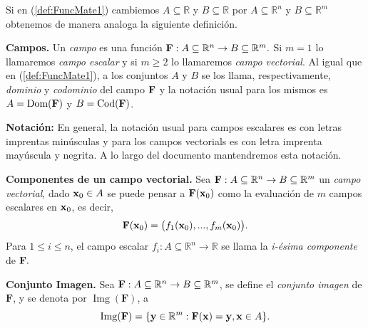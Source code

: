 
\begin{obs}
Si en  (\ref{def:FuncMate1})  cambiemos  $A \subseteq \mathbb{R}$ y $B\subseteq \mathbb{R}$ por $A \subseteq \mathbb{R}^{n}$ y $B \subseteq \mathbb{R}^{m}$  obtenemos de manera analoga la siguiente definici\'on.    
\end{obs}





\begin{definition} \textbf{Campos.}
  Un \textit{campo} es una funci\'on   $\campoVec{F}:A\subseteq \mathbb{R}^n \rightarrow B \subseteq \mathbb{R}^m.$    Si $m=1$ lo llamaremos  \textit{ campo escalar }  y  si  $m\geq 2$ lo llamaremos   \textit{ campo vectorial}. Al igual que en (\ref{def:FuncMate1}), a los conjuntos $A$ y $B$  se los llama, respectivamente, \textit{dominio}  y \textit{codominio} del campo $\campoVec{F}$ y  la notaci\'on usual para los mismos  es  $A=\text{Dom}( \campoVec{F})$ y $B=\text{Cod}( \campoVec{F})$.   
  \end{definition}
  
\textbf{Notaci\'on: } En general, la notaci\'on usual  para campos escalares es  con letras imprentas minúsculas y para  los campos vectorials es con letra imprenta mayúscula y negrita. A lo largo del documento mantendremos esta notación. 
  
  \begin{definition} {\textbf{Componentes de un campo vectorial.}}
  Sea   $\campoVec{F}:A\subseteq \mathbb{R}^n \rightarrow B \subseteq \mathbb{R}^m$   un \textit{campo vectorial}, dado $\vect{x}_0 \in A$ se puede pensar a  $\mathbf{F}(\vect{x}_0)$   como la evaluación de $m$ campos escalares en $\vect{x}_0$, 
    es decir,
    \begin{equation*}
        \campoVec{F}(\vect{x}_0)=\big( f_1(\vect{x}_0),..., f_m(\vect{x}_0) \big).
    \end{equation*}
  Para $1 \leq i \leq n$,  el campo escalar $f_i: A\subseteq \mathbb{R}^n \rightarrow  \mathbb{R}$ se llama la \textit{i-\'esima componente} de $\campoVec{F}.$
 \end{definition}
  
  
  \begin{definition}{\textbf{Conjunto Imagen.}}
    Sea  $\campoVec{F}:A\subseteq \mathbb{R}^n \rightarrow B \subseteq \mathbb{R}^m$, se define el \textit{conjunto imagen} de $\mathbf{F}$, y se denota por $ \operatorname{Img}(\mathbf{F})$, a 
    \begin{equation*}
        \operatorname{Img}(\campoVec{F})=\{\mathbf{y}\in\mathbb{R}^m: \mathbf{F}(\mathbf{x})=\mathbf{y}, \mathbf{x} \in A\}.
    \end{equation*}
  \end{definition}
  
